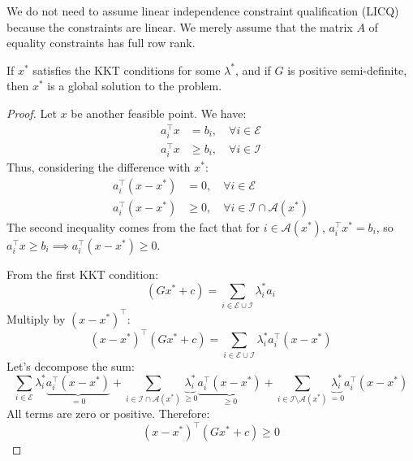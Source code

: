     \begin{remarque}
        We do not need to assume linear independence constraint qualification (LICQ) because the constraints are linear. We merely assume that the matrix $A$ of equality constraints has full row rank.
    \end{remarque}

    \begin{theoreme}
        If $x^*$ satisfies the KKT conditions for some $\lambda^*$, and if $G$ is positive semi-definite, then $x^*$ is a global solution to the problem.
    \end{theoreme}

    \begin{proof}
        Let $x$ be another feasible point. We have:
        \begin{equation}
            \begin{aligned}
                a_i^\top x &= b_i, \quad \forall i \in \mathcal{E} \\
                a_i^\top x &\ge b_i, \quad \forall i \in \mathcal{I}
            \end{aligned}
        \end{equation}
        Thus, considering the difference with $x^*$:
        \begin{equation}
            \begin{aligned}
                a_i^\top (x - x^*) &= 0, \quad \forall i \in \mathcal{E} \\
                a_i^\top (x - x^*) &\ge 0, \quad \forall i \in \mathcal{I} \cap \mathcal{A}(x^*)
            \end{aligned}
        \end{equation}
        The second inequality comes from the fact that for $i \in \mathcal{A}(x^*)$, $a_i^\top x^* = b_i$, so $a_i^\top x \ge b_i \implies a_i^\top (x - x^*) \ge 0$.

        From the first KKT condition:
        \begin{equation}
            (G x^* + c) = \sum_{i \in \mathcal{E} \cup \mathcal{I}} \lambda_i^* a_i
        \end{equation}
        Multiply by $(x - x^*)^\top$:
        \begin{equation}
            (x - x^*)^\top (G x^* + c) = \sum_{i \in \mathcal{E} \cup \mathcal{I}} \lambda_i^* a_i^\top (x - x^*)
        \end{equation}
        Let's decompose the sum:
        \begin{equation}
            \sum_{i \in \mathcal{E}} \lambda_i^* \underbrace{a_i^\top (x - x^*)}_{=0} + \sum_{i \in \mathcal{I} \cap \mathcal{A}(x^*)} \underbrace{\lambda_i^*}_{\ge 0} \underbrace{a_i^\top (x - x^*)}_{\ge 0} + \sum_{i \in \mathcal{I} \setminus \mathcal{A}(x^*)} \underbrace{\lambda_i^*}_{=0} a_i^\top (x - x^*)
        \end{equation}
        All terms are zero or positive. Therefore:
        \begin{equation}
            (x - x^*)^\top (G x^* + c) \ge 0
        \end{equation}


\end{proof}

